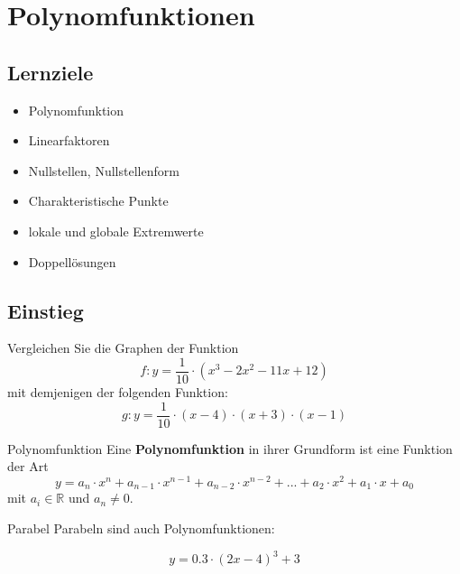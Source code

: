 
\section{Polynomfunktionen}

\subsection*{Lernziele}

\begin{itemize}
\item Polynomfunktion
\item Linearfaktoren
\item Nullstellen, Nullstellenform
\item Charakteristische Punkte
\item lokale und globale Extremwerte
\item Doppellösungen
\end{itemize}

\newpage


\subsection{Einstieg}
Vergleichen Sie die Graphen der Funktion
$$f: y= \frac1{10}\cdot{}(x^3-2x^2-11x+12)$$
mit demjenigen der folgenden Funktion:
$$g: y=\frac1{10}\cdot{}(x-4)\cdot{}(x+3)\cdot{}(x-1)$$



\newpage
\begin{definition}{Polynomfunktion}{}
  Eine \textbf{Polynomfunktion} in ihrer Grundform ist eine Funktion
  der Art
  $$y = a_n\cdot{}x^n + a_{n-1}\cdot{}x^{n-1} + a_{n-2}\cdot{}x^{n-2}
  + ... + a_2\cdot{}x^2 + a_1\cdot{}x + a_0$$
  mit $a_i\in \mathbb{R}$ und $a_n\ne 0$.
\end{definition}

\begin{bemerkung}{Parabel}{}
  Parabeln sind auch Polynomfunktionen:

  $$y  = 0.3\cdot{}(2x-4)^3 + 3$$
  
\end{bemerkung}



